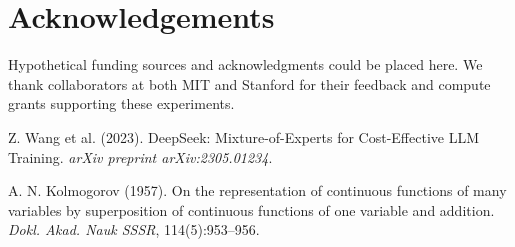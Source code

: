 \documentclass[twocolumn]{article}
\begin{document}
\section*{Acknowledgements}
Hypothetical funding sources and acknowledgments could be placed here. We thank collaborators at both MIT and Stanford for their feedback and compute grants supporting these experiments.


\begin{thebibliography}{9}

Z. Wang et al. (2023).
\newblock DeepSeek: Mixture-of-Experts for Cost-Effective LLM Training.
\newblock \emph{arXiv preprint arXiv:2305.01234}.

A. N. Kolmogorov (1957).
\newblock On the representation of continuous functions of many variables by superposition of continuous functions of one variable and addition.
\newblock \emph{Dokl. Akad. Nauk SSSR}, 114(5):953–956.

\end{thebibliography}
\end{document}
